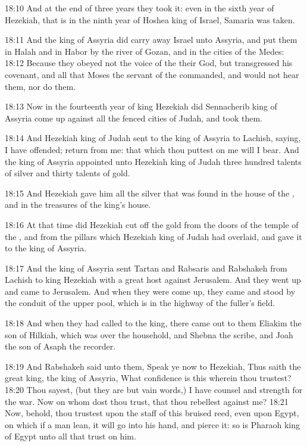 18:10 And at the end of three years they took it: even in the sixth
year of Hezekiah, that is in the ninth year of Hoshea king of Israel,
Samaria was taken.

18:11 And the king of Assyria did carry away Israel unto Assyria, and
put them in Halah and in Habor by the river of Gozan, and in the
cities of the Medes: 18:12 Because they obeyed not the voice of the
\LORD their God, but transgressed his covenant, and all that Moses the
servant of the \LORD commanded, and would not hear them, nor do them.

18:13 Now in the fourteenth year of king Hezekiah did Sennacherib king
of Assyria come up against all the fenced cities of Judah, and took
them.

18:14 And Hezekiah king of Judah sent to the king of Assyria to
Lachish, saying, I have offended; return from me: that which thou
puttest on me will I bear. And the king of Assyria appointed unto
Hezekiah king of Judah three hundred talents of silver and thirty
talents of gold.

18:15 And Hezekiah gave him all the silver that was found in the house
of the \LORD, and in the treasures of the king's house.

18:16 At that time did Hezekiah cut off the gold from the doors of the
temple of the \LORD, and from the pillars which Hezekiah king of Judah
had overlaid, and gave it to the king of Assyria.

18:17 And the king of Assyria sent Tartan and Rabsaris and Rabshakeh
from Lachish to king Hezekiah with a great host against Jerusalem. And
they went up and came to Jerusalem. And when they were come up, they
came and stood by the conduit of the upper pool, which is in the
highway of the fuller's field.

18:18 And when they had called to the king, there came out to them
Eliakim the son of Hilkiah, which was over the household, and Shebna
the scribe, and Joah the son of Asaph the recorder.

18:19 And Rabshakeh said unto them, Speak ye now to Hezekiah, Thus
saith the great king, the king of Assyria, What confidence is this
wherein thou trustest?  18:20 Thou sayest, (but they are but vain
words,) I have counsel and strength for the war. Now on whom dost thou
trust, that thou rebellest against me?  18:21 Now, behold, thou
trustest upon the staff of this bruised reed, even upon Egypt, on
which if a man lean, it will go into his hand, and pierce it: so is
Pharaoh king of Egypt unto all that trust on him.

